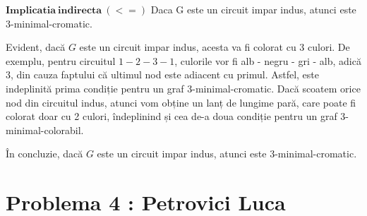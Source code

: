 \documentclass{article}
\begin{document}
{$\mathbf{Implicatia\ indirecta\ (<=)}$ Daca G este un circuit impar indus, atunci este 3-minimal-cromatic.

Evident, dacă $G$ este un circuit impar indus, acesta va fi colorat cu 3 culori. De exemplu, pentru circuitul $1 - 2 - 3 - 1$, culorile vor fi alb - negru - gri - alb, adică 3, din cauza faptului că ultimul nod este adiacent cu primul. Astfel, este indeplinită prima condiție pentru un graf 3-minimal-cromatic. Dacă scoatem orice nod din circuitul indus, atunci vom obține un lanț de lungime pară, care poate fi colorat doar cu 2 culori, îndeplinind și cea de-a doua condiție pentru un graf 3-minimal-colorabil.

În concluzie, dacă $G$ este un circuit impar indus, atunci este 3-minimal-cromatic.

}

\section*{\fontsize{20}{50}\selectfont Problema 4 : Petrovici Luca}
\end{document}
